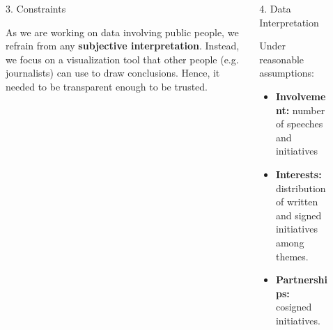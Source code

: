 \documentclass[final]{beamer}
\newlength{\sepwid}
\newlength{\onecolwid}
\newlength{\twocolwid}
\begin{document}
\begin{frame}[t]
\begin{columns}[t]
\begin{column}{\onecolwid}
\end{column} %

\begin{column}{\sepwid}\end{column} %

\begin{column}{\twocolwid} %

\begin{columns}[t,totalwidth=\twocolwid] %

\begin{column}{\onecolwid}\vspace{-.6in} %



\begin{alertblock}{3. Constraints}

As we are working on data involving public people, we refrain from any \textbf{subjective interpretation}. Instead, we focus on a visualization tool that other people (e.g. journalists) can use to draw conclusions. Hence, it needed to be transparent enough to be trusted.


\end{alertblock}



\end{column} %

\begin{column}{\onecolwid}\vspace{-.6in} %



\begin{alertblock}{4. Data Interpretation}

Under reasonable assumptions:
\begin{itemize}
\item \textbf{Involvement:} number of speeches and initiatives
\item \textbf{Interests:} distribution of written and signed initiatives among themes.
\item \textbf{Partnerships:} cosigned initiatives.
\end{itemize}


\end{alertblock}
\end{column}
\end{columns}
\end{column}
\end{columns}
\end{frame}
\end{document}

